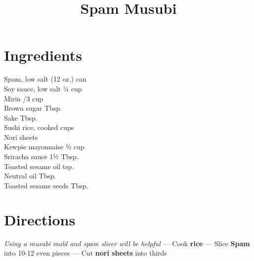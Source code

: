 \documentclass[11pt,letterpaper]{article}
\title{Spam Musubi}
\author{}
\date{}
\begin{document}
\maketitle
\thispagestyle{empty}

\section*{Ingredients}
\setlength{\columnsep}{20pt}
\begin{multicols}{2}
\noindent
    Spam, low salt  (12 oz.) can \\
    Soy sauce, low salt \dotfill ¼ cup \\
    Mirin /3 cup \\
    Brown sugar  Tbsp. \\
    Sake  Tbsp. \\
    Sushi rice, cooked  cups \\
    Nori sheets  \\
    Kewpie mayonnaise \dotfill ½ cup \\
    Sriracha sauce \dotfill 1½ Tbsp. \\
    Toasted sesame oil  tsp. \\
    Neutral oil  Tbsp. \\
    Toasted sesame seeds  Tbsp.
\end{multicols}

\section*{Directions}

\noindent
\textit{Using a musubi mold and spam slicer will be helpful} ---
Cook \textbf{rice} ---
Slice \textbf{Spam} into 10-12 even pieces ---
Cut \textbf{nori sheets} into thirds
\end{document}

